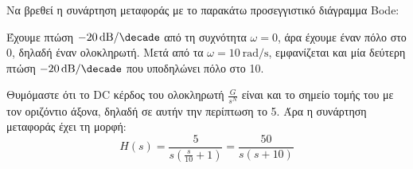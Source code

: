 \documentclass[11pt,a4paper,notitlepage,fleqn,final]{article}
\begin{document}
\begin{exercise}
Να βρεθεί η συνάρτηση μεταφοράς με το παρακάτω προσεγγιστικό διάγραμμα Bode:


\tcblower
Έχουμε πτώση \( \SI{-20}{\decibel/\decade} \) από τη συχνότητα \( \omega = 0 \), άρα έχουμε
έναν πόλο στο 0, δηλαδή έναν ολοκληρωτή. Μετά από τα \( \omega = \SI{10}{\radian/\second} \),
εμφανίζεται και μία δεύτερη πτώση \( \SI{-20}{\decibel/\decade} \) που υποδηλώνει πόλο
στο 10.

Θυμόμαστε ότι το DC κέρδος του ολοκληρωτή \( \frac{G}{s^N} \) είναι και το σημείο τομής
του με τον οριζόντιο άξονα, δηλαδή σε αυτήν την περίπτωση το 5. Άρα η συνάρτηση
μεταφοράς έχει τη μορφή:
\[
H(s) = \frac{5}{s\left(\frac{s}{10}+1\right)} = \frac{50}{s(s+10)}
\]
\end{exercise}
\end{document}

